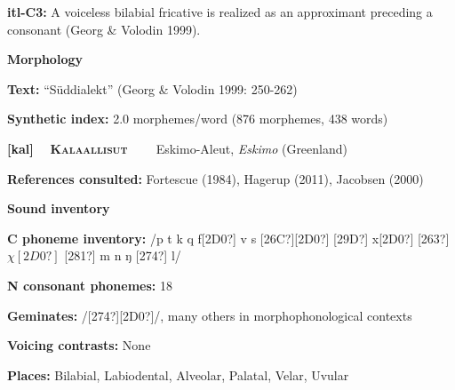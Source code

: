 \begin{styleBody}
\textbf{itl-C3: }A voiceless bilabial fricative is realized as an approximant preceding a consonant (Georg \& Volodin 1999).
\end{styleBody}

\begin{styleBody}
\textbf{Morphology}
\end{styleBody}

\begin{styleBody}
\textbf{Text:} “Süddialekt” (Georg \& Volodin 1999: 250-262)
\end{styleBody}

\begin{styleBody}
\textbf{Synthetic index: }2.0 morphemes/word (876 morphemes, 438 words)
\end{styleBody}

\clearpage\begin{styleBody}
\textbf{[kal] }\ \ \textbf{\textsc{Kalaallisut}}\textbf{\ \ \ \ }Eskimo-Aleut, \textit{Eskimo} (Greenland)
\end{styleBody}

\begin{styleBody}
\textbf{References consulted: }Fortescue (1984), Hagerup (2011), Jacobsen (2000)
\end{styleBody}

\begin{styleBody}
\textbf{Sound inventory}
\end{styleBody}

\begin{styleBody}
\textbf{C phoneme inventory:} /p t k q f[2D0?] v s [26C?][2D0?] [29D?] x[2D0?] [263?] $\chi [2D0?]$ [281?] m n ŋ [274?] l/
\end{styleBody}

\begin{styleBody}
\textbf{N consonant phonemes:} 18
\end{styleBody}

\begin{styleBody}
\textbf{Geminates:} /[274?][2D0?]/, many others in morphophonological contexts
\end{styleBody}

\begin{styleBody}
\textbf{Voicing contrasts:} None
\end{styleBody}

\begin{styleBody}
\textbf{Places:} Bilabial, Labiodental, Alveolar, Palatal, Velar, Uvular
\end{styleBody}

